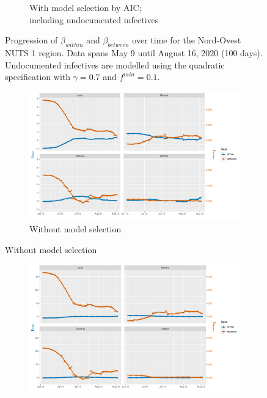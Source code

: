 \documentclass[12pt]{article}
\begin{document}
\begin{appendices}
\begin{figure}[H]
\begin{subfigure}{\textwidth}
    	      \caption{With model selection by AIC; \\ including undocumented infectives}
    	      \label{fig:beta_between_over_time_nordovest_aic_undoc}
    	    \end{subfigure}
    	    \caption{Progression of $\beta_{within}$ and $\beta_{between}$ over time for the Nord-Ovest NUTS 1 region. Data spans May 9 until August 16, 2020 (100 days). Undocumented infectives are modelled using the quadratic specification with $\gamma = 0.7$ and $f^{min}=0.1$.}
    	    \label{fig:beta_between_over_time_nordovest}
        \end{figure}
		
		\begin{figure}[H]
    	    \centering
    	    \begin{subfigure}{\textwidth}
    	      \centering
    	      \includegraphics[width=\linewidth]{output/model_between_lag14_betas_Centro (IT)_rolling.pdf}
    	      \caption{Without model selection}
    	      \label{fig:beta_between_over_time_centro_regular}
    	    \end{subfigure}
        \end{figure}
        \begin{figure}[H]\ContinuedFloat
    	    \begin{subfigure}{\textwidth}
    	      \centering
    	      \includegraphics[width=\linewidth]{output/model_between_lag14_betas_Centro (IT)_aic_rolling.pdf}

\end{subfigure}
\end{figure}
\end{appendices}
\end{document}
